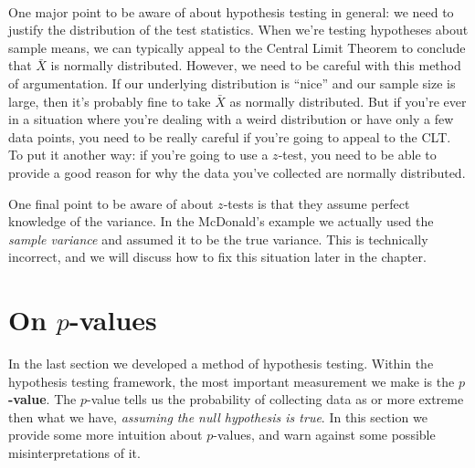 \ \\

One \nb  major point to be aware of about hypothesis testing in general: we need to justify the distribution of the test statistics. When we're testing hypotheses about sample means, we can typically appeal to the Central Limit Theorem to conclude that $\bar{X}$ is normally distributed.  However, we need to be careful with this method of argumentation.  If our underlying distribution is ``nice'' and our sample size is large, then it's probably fine to take $\bar{X}$ as normally distributed.  But if you're ever in a situation where you're dealing with a weird distribution or have only a few data points, you need to be really careful if you're going to appeal to the CLT.  To put it another way: if you're going to use a $z$-test, you need to be able to provide a good reason for why the data you've collected are normally distributed.

One final point to be aware of about $z$-tests is that they assume perfect knowledge of the variance. In the McDonald's example we actually used the \emph{sample variance} and assumed it to be the true variance. This is technically incorrect, and we will discuss how to fix this situation later in the chapter.


\section{On $p$-values} \label{sec:P-values}

In the last section we developed a method of hypothesis testing. Within the hypothesis testing framework, the most important measurement we make is the \textbf{$p$-value}. The $p$-value tells us the probability of collecting data as or more extreme then what we have, \emph{assuming the null hypothesis is true}. In this section we provide some more intuition about $p$-values, and warn against some possible misinterpretations of it.




